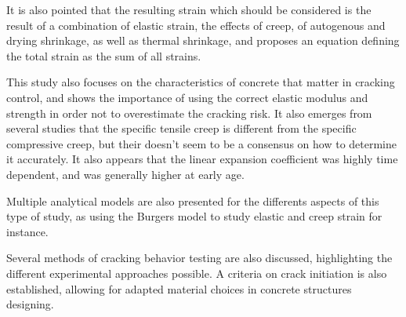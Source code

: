 \documentclass{report}
\begin{document}
It is also pointed that the resulting strain which should be considered is the
result of a combination of elastic strain, the effects of creep, of autogenous
and drying shrinkage, as well as thermal shrinkage, and proposes an equation
defining the total strain as the sum of all strains.

This study also focuses on the characteristics of concrete that matter in
cracking control, and shows the importance of using the correct elastic modulus
and strength in order not to overestimate the cracking risk. It also emerges
from several studies that the specific tensile creep is different from the
specific compressive creep, but their doesn't seem to be a consensus on how to
determine it accurately. It also appears that the linear expansion coefficient
was highly time dependent, and was generally higher at early age.

Multiple analytical models are also presented for the differents aspects of
this type of study, as using the Burgers model to study elastic and creep
strain for instance.

Several methods of cracking behavior testing are also discussed, highlighting
the different experimental approaches possible. A criteria on crack initiation
is also established, allowing for adapted material choices in concrete
structures designing.


\nocite{*}
\printbibliography
\end{document}
